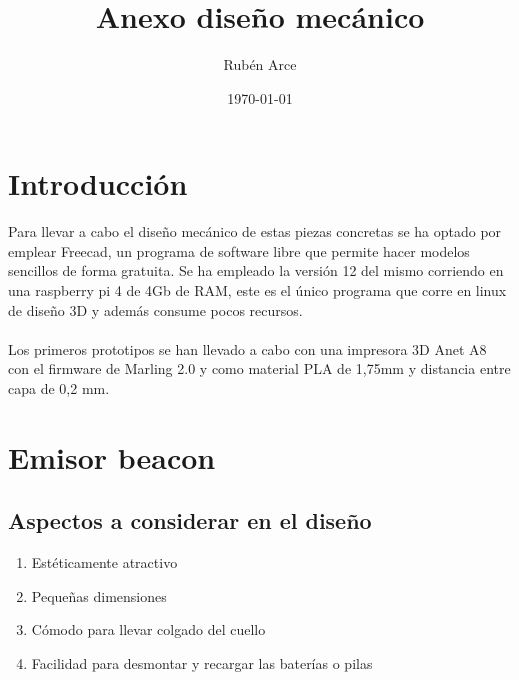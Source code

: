 \documentclass[a4paper ,12pt, onecolumn]{article}
\begin{document}
\title{Anexo diseño mecánico}

\author{Rubén Arce}
\date{\today}
\maketitle
\cleardoublepage
\tableofcontents
\cleardoublepage

\section{Introducción}
Para llevar a cabo el diseño mecánico de estas piezas concretas se ha optado por emplear Freecad, un
programa de software libre que permite hacer modelos sencillos de forma gratuita.
Se ha empleado la versión 12 del mismo corriendo en una raspberry pi 4 de 4Gb de RAM, este es el único
programa que corre en linux de diseño 3D y además consume pocos recursos.
\paragraph{}
Los primeros prototipos se han llevado a cabo con una impresora 3D Anet A8 con el firmware de Marling
2.0 y como material PLA de 1,75mm y distancia entre capa de 0,2 mm.
\section{Emisor beacon}
    \subsection{Aspectos a considerar en el diseño}
        \begin{enumerate}
            \item Estéticamente atractivo
            \item Pequeñas dimensiones
            \item Cómodo para llevar colgado del cuello
            \item Facilidad para desmontar y recargar las baterías o pilas
        \end{enumerate}
\end{document}
